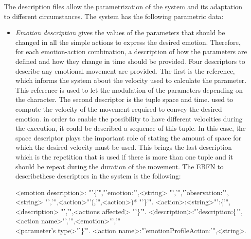 The description files allow the parametrization of the system and its adaptation to different circumstances. The system has the following parametric data:

\begin{itemize}
	\item \textit{Emotion description} gives the values of the parameters that should be changed in all the simple actions to express the desired emotion. Therefore, for each emotion-action combination, a description of how the parameters are defined and how they change in time should be provided. 
Four descriptors to describe any emotional movement are provided. %
The first is the reference, which informs the system about the velocity used to calculate the parameter. This reference is used to let the modulation of the parameters depending on the character. The second descriptor is the tuple space and time. used to compute the velocity of the movement required to convey the desired emotion. %
in order to enable the possibility to have different velocities during the execution, it could be described a sequence of this tuple. In this case, the space descriptor plays the important role of stating the amount of space for which the desired velocity must be used. This brings the last description which is the repetition that is used if there is more than one tuple and it should be repeat during the duration of the movement. The EBFN to describethese descriptors in the system is the following: 
\begin{grammar}
<emotion description>: "'\{'","'emotion:'",<string> "','","'observation:'",<string> "','",<action>"'(,'",<action>)* "'\}'".
<action>:<string>"':\{'",<description> "','",<actions affected> "'\}'".
<description>:"'description:\{'",<action name>"','",<emotion>"','"\\
<parameter's type>"'\}'".
<action name>:"'emotionProfileAction:'",<string>.

\end{grammar}
\end{itemize}
